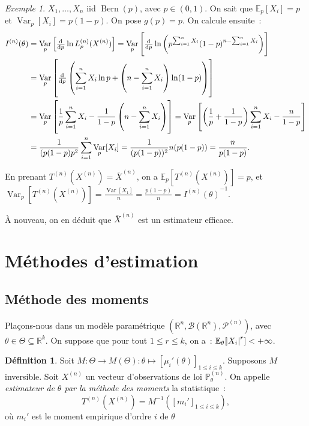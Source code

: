 \documentclass{report}
\DeclareMathOperator{\Bern}{Bern}  %
\DeclareMathOperator{\Var}{Var}
\renewcommand{\P}{\mathbb P}
\newcommand{\E}{\mathbb E}
\newcommand{\pinfty}{{+\infty}}
\newcommand{\statmod}[4]{\left(#1^{#4}, #2\left(#1^{#4}\right), #3^{\left(#4\right)}\right)}
\newcommand{\R}{\mathbb R}
\newcommand{\Brl}{\mathcal B}  %
\newcommand{\n}{{(n)}}
\newcommand{\Xn}{{X^\n}}
\newcommand{\Tn}{{T^\n}}
\newcommand{\TnXn}{{\Tn(\Xn)}}
\theoremstyle{definition}
\newtheorem{déf}[thm]{Définition}
\theoremstyle{remark}
\newtheorem{ex}{Exemple}[chapter]
\begin{document}
			\begin{ex} $X_1, \ldots, X_n$ iid $\Bern(p)$, avec $p \in (0, 1)$. On sait que $\E_p[X_i] = p$ et $\Var_p[X_i] = p(1-p)$. On pose $g(p) = p$.
			On calcule ensuite~:
			\begin{align*}
				I^{(n)}(\theta) &= \Var_p\left[\od {}p \ln L_p^{(n)}(X^{(n)})\right] = \Var_p\left[\od {}p\ln\left(p^{\sum_{i=1}^nX_i}(1-p)^{n-\sum_{i=1}^nX_i}\right)\right] \\
				&= \Var_p\left[\od {}p\left(\sum_{i=1}^nX_i \ln p + \left(n - \sum_{i=1}^nX_i\right)\ln(1-p)\right)\right] \\
				&= \Var_p\left[\frac 1p\sum_{i=1}^nX_i - \frac 1{1-p}\left(n-\sum_{i=1}^nX_i\right)\right]
					= \Var_p\left[\left(\frac 1p+\frac 1{1-p}\right)\sum_{i=1}^nX_i -\frac n{1-p}\right] \\
				&= \frac 1{(p(1-p)p^2}\sum_{i=1}^n\Var_p[X_i] = \frac 1{(p(1-p))^2}n(p(1-p)) = \frac n{p(1-p)}.
			\end{align*}

			En prenant $\TnXn = \overline X^{(n)}$, on a $\E_p[\TnXn] = p$, et $\Var_p[\TnXn] = \frac {\Var[X_1]}n = \frac {p(1-p)}n = {I^{(n)}(\theta)}^{-1}$.

			À nouveau, on en déduit que $\overline X^{(n)}$ est un estimateur efficace.
			\end{ex}

	\section{Méthodes d'estimation}
		\subsection{Méthode des moments}
			Plaçons-nous dans un modèle paramétrique $\statmod \R\Brl{\mathcal P}n$, avec $\theta \in \Theta \subseteq \R^k$. On suppose que pour tout $1 \leq r \leq k$,
			on a~: $\E_\theta[\abs {X_i}^r] < \pinfty$.

			\begin{déf} Soit $M : \Theta \to M(\Theta) : \theta \mapsto \left[\mu_i'(\theta)\right]_{1 \leq i \leq k}$. Supposons $M$ inversible. Soit $\Xn$ un vecteur
			d'observations de loi $\P_\theta^{(n)}$. On appelle \textit{estimateur de $\theta$ par la méthode des moments} la statistique~:
			\[\TnXn = M^{-1}\left([m_i']_{1 \leq i \leq k}\right),\]
			où $m_i'$ est le moment empirique d'ordre $i$ de $\theta$
			\end{déf}
\end{document}
